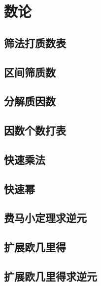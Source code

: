 \section{数论}
\subsection{筛法打质数表}


\subsection{区间筛质数}


\subsection{分解质因数}


\subsection{因数个数打表}


\subsection{快速乘法}


\subsection{快速幂}


\subsection{费马小定理求逆元}



\subsection{扩展欧几里得}


\subsection{扩展欧几里得求逆元}




